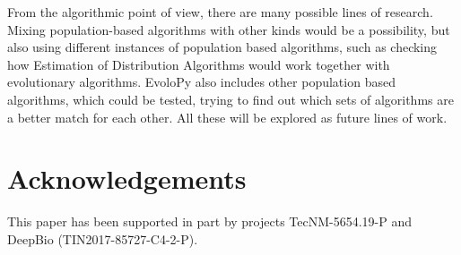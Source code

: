\documentclass[review]{elsarticle}
\begin{document}
From the algorithmic point of view, there are many possible lines of
research. Mixing population-based algorithms with other kinds
would be a possibility, but also using different instances of
population based algorithms, such as checking how Estimation of
Distribution Algorithms would work together with evolutionary
algorithms. EvoloPy also includes other population based algorithms,
which could be tested, trying to find out which sets of algorithms are
a better match for each other. All these will be explored as future
lines of work.

\section{Acknowledgements}

This paper has been supported in part by projects TecNM-5654.19-P and DeepBio
(TIN2017-85727-C4-2-P).




\end{document}
